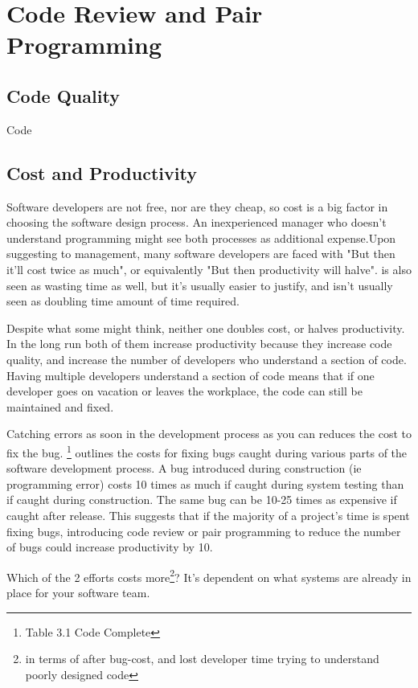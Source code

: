 \documentclass{article}
\begin{document}
\section{Code Review and Pair Programming}

\subsection{Code Quality}

Code

\subsection{Cost and Productivity}

Software developers are not free, nor are they cheap, so cost is a big factor in choosing the software design process. An inexperienced manager who doesn't understand programming might see both processes as additional expense.Upon suggesting \PP to management, many software developers are faced with "But then it'll cost twice as much", or equivalently "But then productivity will halve". \CR is also seen as wasting time as well, but it's usually easier to justify, and isn't usually seen as doubling time amount of time required.

Despite what some might think, neither one doubles cost, or halves productivity. In the long run both of them increase productivity because they increase code quality, and increase the number of developers who understand a section of code. Having multiple developers understand a section of code means that if one developer goes on vacation or leaves the workplace, the code can still be maintained and fixed.

Catching errors as soon in the development process as you can reduces the cost to fix the bug. \cite{avgCostOfDefect}\footnote{Table 3.1 Code Complete} outlines the costs for fixing bugs caught during various parts of the software development process. A bug introduced during construction (ie programming error) costs 10 times as much if caught during system testing than if caught during construction. The same bug can be 10-25 times as expensive if caught after release. This suggests that if the majority of a project's time is spent fixing bugs, introducing code review or pair programming to reduce the number of bugs could increase productivity by 10.

Which of the 2 efforts costs more\footnote{in terms of after bug-cost, and lost developer time trying to understand poorly designed code}? It's dependent on what systems are already in place for your software team. 
\end{document}
